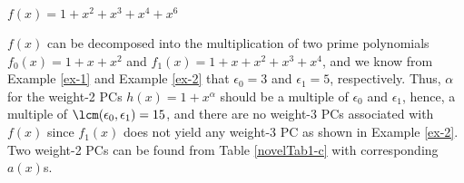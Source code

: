 \begin{example}
$f(x)=1+x^2+x^3+x^4+x^6$

$f(x)$ can be decomposed into the multiplication of two prime polynomials $f_0(x)=1+x+x^2$ and $f_1(x)=1+x+x^2+x^3+x^4$, and we know from Example \ref{ex-1} and Example \ref{ex-2} that $\epsilon_0=3$ and $\epsilon_1=5$, respectively. Thus, $\alpha$ for the weight-2 PCs $h(x) = 1+x^\alpha$ should be a multiple of $\epsilon_0$ and $\epsilon_1$, hence, a multiple of $\lcm(\epsilon_0,\epsilon_1)=15$, and there are no weight-3 PCs associated with $f(x)$ since $f_1(x)$ does not yield any weight-3 PC as shown in Example \ref{ex-2}. Two weight-2 PCs can be found from Table \ref{novelTab1-c} with corresponding $a(x)$s.



\label{ex-4}
\end{example}

